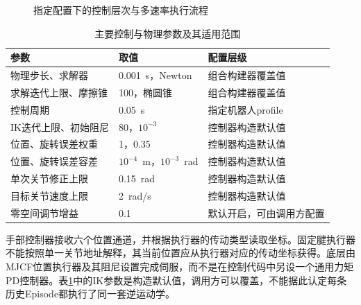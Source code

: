\begin{figure}[htbp]
  \centering
  \caption{指定配置下的控制层次与多速率执行流程}
  \label{fig:ch02_control}
\end{figure}

\begin{table}[htbp]
  \centering\small
  \caption{主要控制与物理参数及其适用范围}
  \label{tab:ch02_control_parameters}
  \begin{tabular}{p{}p{}p{}}
    \hline
    参数 & 取值 & 配置层级\\
    \hline
    物理步长、求解器 & 0.001~s，Newton & 组合构建器覆盖值\\
    求解迭代上限、摩擦锥 & 100，椭圆锥 & 组合构建器覆盖值\\
    控制周期 & 0.05~s & 指定机器人profile\\
    IK迭代上限、初始阻尼 & 80，$10^{-3}$ & 控制器构造默认值\\
    位置、旋转误差权重 & 1，0.35 & 控制器构造默认值\\
    位置、旋转误差容差 & $10^{-4}$~m，$10^{-3}$~rad & 控制器构造默认值\\
    单次关节修正上限 & 0.15~rad & 控制器构造默认值\\
    目标关节速度上限 & 2~rad/s & 控制器构造默认值\\
    零空间调节增益 & 0.1 & 默认开启，可由调用方配置\\
    \hline
  \end{tabular}
\end{table}

手部控制器接收六个位置通道，并根据执行器的传动类型读取坐标。固定腱执行器不能按照单一关节地址解释，其当前位置应从执行器对应的传动坐标获得。底层由MJCF位置执行器及其阻尼设置完成伺服，而不是在控制代码中另设一个通用力矩PD控制器\cite{mujoco2026xml}。表\ref{tab:ch02_control_parameters}中的IK参数是构造默认值，调用方可以覆盖，不能据此认定每条历史Episode都执行了同一套逆运动学。

